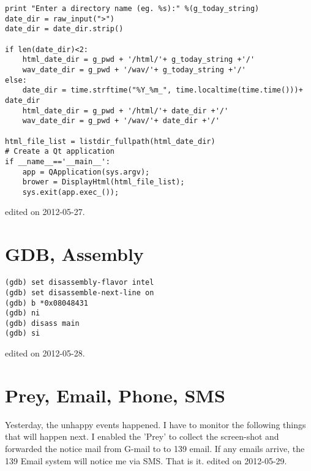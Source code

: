 \begin{verbatim}
print "Enter a directory name (eg. %s):" %(g_today_string)
date_dir = raw_input(">")
date_dir = date_dir.strip()

if len(date_dir)<2:
    html_date_dir = g_pwd + '/html/'+ g_today_string +'/'
    wav_date_dir = g_pwd + '/wav/'+ g_today_string +'/'
else:
    date_dir = time.strftime("%Y_%m_", time.localtime(time.time()))+ date_dir
    html_date_dir = g_pwd + '/html/'+ date_dir +'/'
    wav_date_dir = g_pwd + '/wav/'+ date_dir +'/'

html_file_list = listdir_fullpath(html_date_dir)
# Create a Qt application
if __name__=='__main__':
    app = QApplication(sys.argv);
    brower = DisplayHtml(html_file_list);
    sys.exit(app.exec_());

\end{verbatim}
\hfill {\tiny  edited on 2012-05-27.}
%
\section{GDB, Assembly}
\begin{verbatim}
(gdb) set disassembly-flavor intel
(gdb) set disassemble-next-line on
(gdb) b *0x08048431
(gdb) ni
(gdb) disass main
(gdb) si
\end{verbatim}
\hfill {\tiny  edited on 2012-05-28.}
%
\section{Prey, Email, Phone, SMS}
Yesterday, the unhappy events happened. 
I have to monitor the following things that will happen next.
I enabled the 'Prey' to collect the screen-shot and forwarded the notice mail from G-mail to to 139 email.
If any emails arrive, the 139 Email system will notice me via SMS. That is it.
\hfill {\tiny  edited on 2012-05-29.}
%
